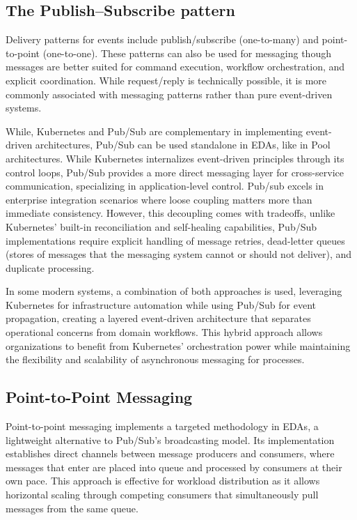\documentclass[]{final}
\begin{document}
\subsection{The Publish–Subscribe pattern}


Delivery patterns for events include publish/subscribe (one-to-many) and
point-to-point (one-to-one). These patterns can also be used for messaging
though messages are better suited for command execution, workflow
orchestration, and explicit coordination. While request/reply is technically
possible, it is more commonly associated with messaging patterns rather than
pure event-driven systems.

While, Kubernetes and Pub/Sub are complementary in implementing event-driven
architectures, Pub/Sub can be used standalone in EDAs, like in Pool
architectures. While Kubernetes internalizes event-driven principles through
its control loops, Pub/Sub provides a more direct messaging layer for
cross-service communication, specializing in application-level control.
Pub/sub excels in enterprise integration scenarios where loose coupling
matters more than immediate consistency. However, this decoupling comes
with tradeoffs, unlike Kubernetes' built-in reconciliation and self-healing
capabilities, Pub/Sub implementations require explicit handling of message
retries, dead-letter queues (stores of messages that the messaging system
cannot or should not deliver), and duplicate processing.

In some modern systems, a combination of both approaches is used, leveraging
Kubernetes for infrastructure automation while using Pub/Sub for event
propagation, creating a layered event-driven architecture that separates
operational concerns from domain workflows. This hybrid approach allows
organizations to benefit from Kubernetes' orchestration power while
maintaining the flexibility and scalability of asynchronous messaging for
processes.

\subsection{Point-to-Point Messaging}
Point-to-point messaging implements a targeted methodology in EDAs, a
lightweight alternative to Pub/Sub's broadcasting model. Its implementation
establishes direct channels between message producers and consumers, where
messages that enter are placed into queue and processed by consumers at
their own pace. This approach is effective for workload distribution as it
allows horizontal scaling through competing consumers that simultaneously
pull messages from the same queue.
\end{document}
